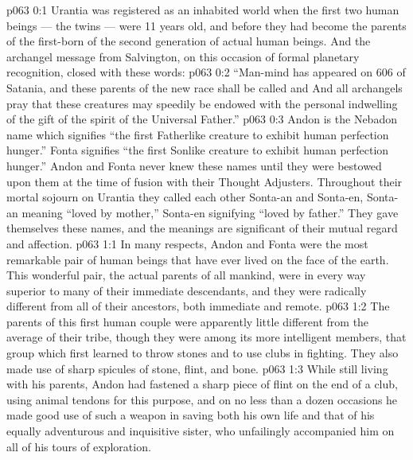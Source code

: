 \author{Life Carrier}
\vs p063 0:1 Urantia was registered as an inhabited world when the first two human beings --- the twins --- were 11 years old, and before they had become the parents of the first\hyp{}born of the second generation of actual human beings. And the archangel message from Salvington, on this occasion of formal planetary recognition, closed with these words:
\vs p063 0:2 “Man\hyp{}mind has appeared on 606 of Satania, and these parents of the new race shall be called  and  And all archangels pray that these creatures may speedily be endowed with the personal indwelling of the gift of the spirit of the Universal Father.”
\vs p063 0:3 \pc Andon is the Nebadon name which signifies “the first Fatherlike creature to exhibit human perfection hunger.” Fonta signifies “the first Sonlike creature to exhibit human perfection hunger.” Andon and Fonta never knew these names until they were bestowed upon them at the time of fusion with their Thought Adjusters. Throughout their mortal sojourn on Urantia they called each other Sonta\hyp{}an and Sonta\hyp{}en, Sonta\hyp{}an meaning “loved by mother,” Sonta\hyp{}en signifying “loved by father.” They gave themselves these names, and the meanings are significant of their mutual regard and affection.
\vs p063 1:1 In many respects, Andon and Fonta were the most remarkable pair of human beings that have ever lived on the face of the earth. This wonderful pair, the actual parents of all mankind, were in every way superior to many of their immediate descendants, and they were radically different from all of their ancestors, both immediate and remote.
\vs p063 1:2 The parents of this first human couple were apparently little different from the average of their tribe, though they were among its more intelligent members, that group which first learned to throw stones and to use clubs in fighting. They also made use of sharp spicules of stone, flint, and bone.
\vs p063 1:3 While still living with his parents, Andon had fastened a sharp piece of flint on the end of a club, using animal tendons for this purpose, and on no less than a dozen occasions he made good use of such a weapon in saving both his own life and that of his equally adventurous and inquisitive sister, who unfailingly accompanied him on all of his tours of exploration.
